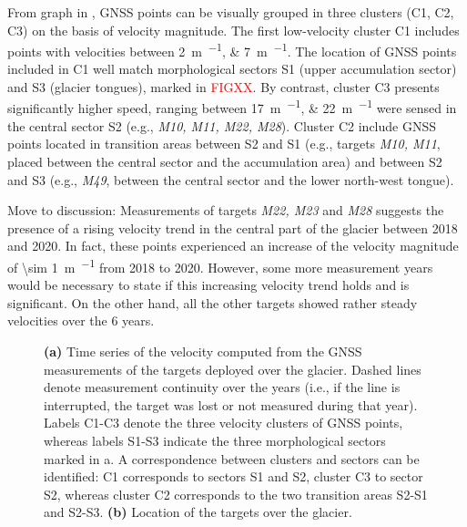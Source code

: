 From graph in , GNSS points can be visually grouped in three clusters (C1, C2, C3) on the basis of velocity magnitude. 
The first low-velocity cluster C1 includes points with velocities between  \qtylist{2;7}{\meter\per\year}. 
{\color{red}
The location of GNSS points included in C1 well match morphological sectors S1 (upper accumulation sector) and S3 (glacier tongues), marked in \textcolor{red}{FIGXX}.
By contrast, cluster C3 presents significantly higher speed, ranging between \qtylist{17;22}{\meter\per\year} were sensed in the central sector S2 (e.g., \textit{M10, M11, M22, M28}).
Cluster C2 include GNSS points located in transition areas between S2 and S1 (e.g., targets \textit{M10, M11}, placed between the central sector and the accumulation area) and between S2 and S3 (e.g., \textit{M49}, between the central sector and the lower north-west tongue).
}

{\color{red} Move to discussion: 
Measurements of targets \textit{M22, M23} and \textit{M28} suggests the presence of a rising velocity trend in the central part of the glacier between 2018 and 2020. 
In fact, these points experienced an increase of the velocity magnitude of \qty{\sim 1}{\meter\per\year} from 2018 to 2020.
However, some more measurement years would be necessary to state if this increasing velocity trend holds and is significant. 
On the other hand, all the other targets showed rather steady velocities over the 6 years.
}

\begin{figure}
    \caption{\textbf{(a)} Time series of the velocity computed from the GNSS measurements of the targets deployed over the glacier. Dashed lines denote measurement continuity over the years (i.e., if the line is interrupted, the target was lost or not measured during that year). Labels C1-C3 denote the three velocity clusters of GNSS points, whereas labels S1-S3 indicate the three morphological sectors marked in a. A correspondence between clusters and sectors can be identified: C1 corresponds to sectors S1 and S2, cluster C3 to sector S2, whereas cluster C2 corresponds to the two transition areas S2-S1 and S2-S3. \textbf{(b)} Location of the targets over the glacier.}
    \label{fig:3:GNSS_velocity}		
\end{figure}

